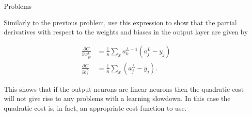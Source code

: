 \begin{exerciseBox}{Problems}
\begin{itemize}
Similarly to the previous problem, use this expression to show that the partial derivatives with respect to the weights and biases in the output layer are given by


\begin{align}
\frac{\partial C}{\partial w^L_{jk}} &= \frac{1}{n} \sum_x a^{L-1}_k (a^L_j-y_j) \tag{69} \\ \frac{\partial C}{\partial b^L_{j}} &= \frac{1}{n} \sum_x (a^L_j-y_j). \tag{70}
\end{align}

This shows that if the output neurons are linear neurons then the quadratic cost will not give rise to any problems with a learning slowdown. In this case the quadratic cost is, in fact, an appropriate cost function to use.

\end{itemize}

\end{exerciseBox}





